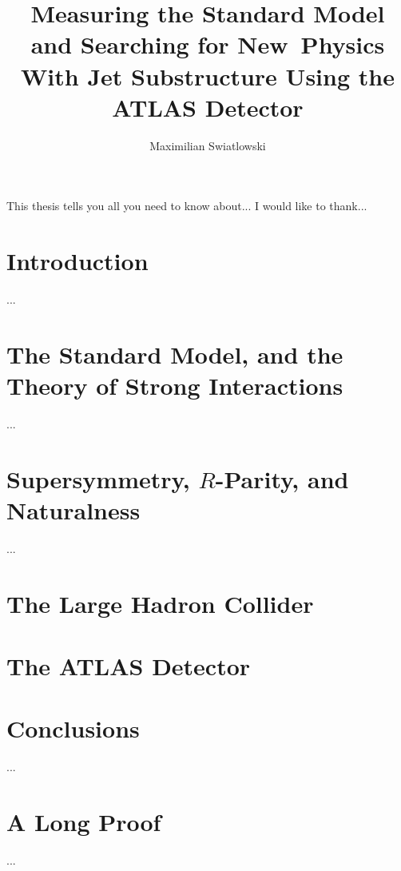 \documentclass{report}
\begin{document}
\title{Measuring the Standard Model and Searching for New~Physics 
        With Jet Substructure Using the ATLAS Detector}
\author{Maximilian Swiatlowski}

 
\beforepreface
{}
    This thesis tells you all you need to know about...
    I would like to thank...
\afterpreface
 
\chapter{Introduction}
         ...

\chapter{The Standard Model, and the Theory of Strong Interactions}
		 ...

\chapter{Supersymmetry, $R$-Parity, and Naturalness}
		 ...


\chapter{The Large Hadron Collider}

		

\chapter{The ATLAS Detector}








\chapter{Conclusions}
         ...
\appendix
\chapter{A Long Proof}
         ...


\end{document}
